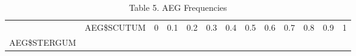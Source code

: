 \begin{longtable}[]{@{}lcccccccccccc@{}}
\caption{Table 5. AEG Frequencies}\tabularnewline
\toprule
\begin{minipage}[t]{0.10\columnwidth}\raggedright\strut
\strut
\end{minipage} & \begin{minipage}[t]{0.10\columnwidth}\centering\strut
AEG\$SCUTUM\strut
\end{minipage} & \begin{minipage}[t]{0.03\columnwidth}\centering\strut
0\strut
\end{minipage} & \begin{minipage}[t]{0.04\columnwidth}\centering\strut
0.1\strut
\end{minipage} & \begin{minipage}[t]{0.04\columnwidth}\centering\strut
0.2\strut
\end{minipage} & \begin{minipage}[t]{0.04\columnwidth}\centering\strut
0.3\strut
\end{minipage} & \begin{minipage}[t]{0.04\columnwidth}\centering\strut
0.4\strut
\end{minipage} & \begin{minipage}[t]{0.04\columnwidth}\centering\strut
0.5\strut
\end{minipage} & \begin{minipage}[t]{0.04\columnwidth}\centering\strut
0.6\strut
\end{minipage} & \begin{minipage}[t]{0.04\columnwidth}\centering\strut
0.7\strut
\end{minipage} & \begin{minipage}[t]{0.04\columnwidth}\centering\strut
0.8\strut
\end{minipage} & \begin{minipage}[t]{0.04\columnwidth}\centering\strut
0.9\strut
\end{minipage} & \begin{minipage}[t]{0.04\columnwidth}\centering\strut
1\strut
\end{minipage}\tabularnewline
\begin{minipage}[t]{0.10\columnwidth}\raggedright\strut
AEG\$STERGUM\strut
\end{minipage} & \begin{minipage}[t]{0.10\columnwidth}\centering\strut
\strut
\end{minipage} & \begin{minipage}[t]{0.03\columnwidth}\centering\strut

\end{minipage}
\end{longtable}
